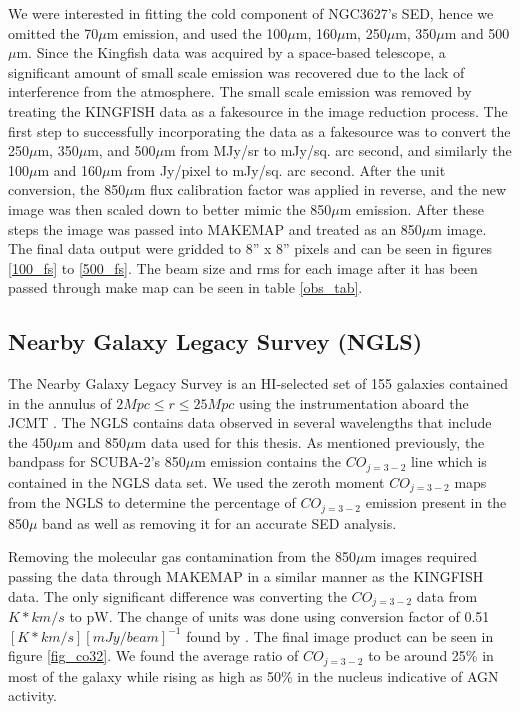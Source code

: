 We were interested in fitting the cold component of NGC3627's SED, hence we omitted the 70$\mu$m emission, and used the 100$\mu$m, 160$\mu$m, 250$\mu$m, 350$\mu$m and 500$\mu$m.  Since the Kingfish data was acquired by a space-based telescope, a significant amount of small scale emission was recovered due to the lack of interference from the atmosphere.  The small scale emission was removed by treating the KINGFISH data as a fakesource in the image reduction process.  The first step to successfully incorporating the data as a fakesource was to convert the 250$\mu$m, 350$\mu$m, and 500$\mu$m from MJy/sr to mJy/sq. arc second, and similarly the 100$\mu$m and 160$\mu$m from Jy/pixel to mJy/sq. arc second.   After the unit conversion, the 850$\mu$m flux calibration factor was applied in reverse, and the new image was then scaled down to better mimic the 850$\mu$m emission.  After these steps the image was passed into MAKEMAP and treated as an 850$\mu$m image.  The final data output were gridded to 8'' x 8'' pixels and can be seen in figures \ref{100_fs} to \ref{500_fs}.  The beam size and rms for each image after it has been passed through make map can be seen in table \ref{obs_tab}.

\subsection{Nearby Galaxy Legacy Survey (NGLS)}

The Nearby Galaxy Legacy Survey is an HI-selected set of 155 galaxies contained in the annulus of $2Mpc\leq r \leq25Mpc$ using the instrumentation aboard the JCMT \citet{wilson2012}.  The NGLS contains data observed in several wavelengths that include the 450$\mu$m and 850$\mu$m data used for this thesis.  As mentioned previously, the bandpass for SCUBA-2's 850$\mu$m emission contains the $CO_{j=3-2}$ line which is contained in the NGLS data set.  We used the zeroth moment $CO_{j=3-2}$ maps from the NGLS to determine the percentage of $CO_{j=3-2}$ emission present in the 850$\mu$ band as well as removing it for an accurate SED analysis.  

Removing the molecular gas contamination from the 850$\mu$m images required passing the data through MAKEMAP in a similar manner as the KINGFISH data.  The only significant difference was converting the $CO_{j=3-2}$ data from $K*km/s$ to pW.  The change of units was done using conversion factor of 0.51 $[K*km/s][mJy/beam]^{-1}$ found by \citet{drabek2012}.  The final image product can be seen in figure \ref{fig_co32}.  We found the average ratio of $CO_{j=3-2}$ to be around 25\% in most of the galaxy while rising as high as 50\% in the nucleus indicative of AGN activity.

